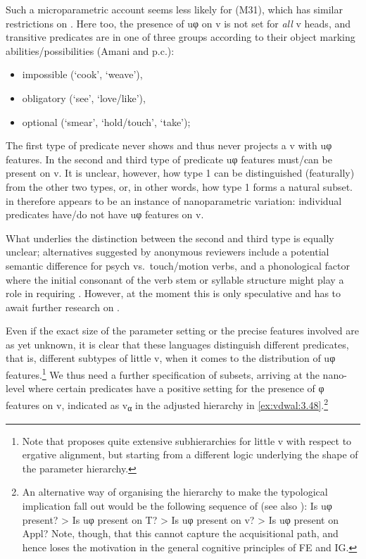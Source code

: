 \documentclass[output=paper]{langsci/langscibook}
\begin{document}
Such a microparametric account seems less likely for  (M31),
which has similar restrictions on  \citep{Lusekelo2012}. Here
too, the presence of uφ on v is not set for \emph{all} v heads, and transitive
predicates are in one of three groups according to their object marking
abilities/possibilities (Amani \citealt{Lusekelo2012} and p.c.):

\begin{itemize}
    \item impossible (‘cook’, ‘weave’),
    \item obligatory (‘see’, ‘love/like’),
    \item optional (‘smear’, ‘hold/touch’, ‘take’);
\end{itemize}

The first type of predicate never shows  and thus never projects
a v with uφ features. In the second and third type of predicate uφ features
must\slash can be present on v. It is unclear, however, how type 1 can be
distinguished (featurally) from the other two types, or, in other words, how
type 1 forms a natural subset.  in  therefore appears to
be an instance of nanoparametric variation: individual predicates have/do not
have uφ features on v.

What underlies the distinction between the second and third type is equally
unclear; alternatives suggested by anonymous reviewers include a potential
semantic difference for psych vs.\ touch/motion verbs, and a phonological
factor where the initial consonant of the verb stem or syllable structure might
play a role in requiring . However, at the moment this is
only speculative and has to await further research on 
.

Even if the exact size of the parameter setting or the precise features
involved are as yet unknown, it is clear that these languages distinguish
different predicates, that is, different subtypes of little v, when it comes to
the distribution of uφ features.\footnote{Note that
    \textcite{Sheehan2014,Sheehan2017} proposes quite extensive subhierarchies
    for little v with respect to ergative alignment, but
    starting from a different logic underlying the shape of the parameter
hierarchy.} We thus need a further specification of subsets, arriving at the
nano-level where certain predicates have a positive setting for the presence of
φ features on v, indicated as v\textsubscript{α} in the adjusted
hierarchy in \eqref{ex:vdwal:3.48}.\footnote{An alternative way of organising the
    hierarchy to make the typological implication fall out would be the
    following sequence of  (see also \citealt{Barany2015}): Is
    uφ present? > Is uφ present on T? > Is uφ present on v? > Is uφ present on
    Appl? Note, though, that this cannot capture the acquisitional path, and hence loses the motivation in the general cognitive
    principles of \gls{FE} and \gls{IG}.}
\end{document}
